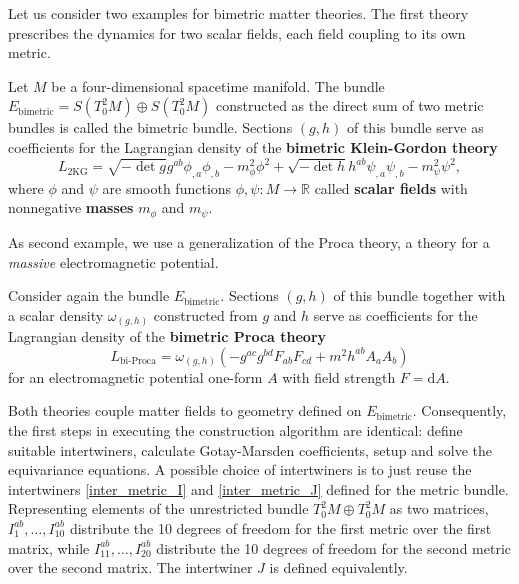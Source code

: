 Let us consider two examples for bimetric matter theories. The first theory prescribes the dynamics for two scalar fields, each field coupling to its own metric.
\begin{definition}
  Let $M$ be a four-dimensional spacetime manifold. The bundle $E_\text{bimetric} = S(T^2_0M) \oplus S(T^2_0M)$ constructed as the direct sum of two metric bundles is called the bimetric bundle. Sections $(g,h)$ of this bundle serve as coefficients for the Lagrangian density of the \textbf{bimetric Klein-Gordon theory}
  \begin{equation}
    L_\text{2KG} = \sqrt{-\operatorname{det}g}g^{ab} \phi_{,a}\phi_{,b} - m_\phi^2 \phi^2 + \sqrt{-\operatorname{det}h}h^{ab} \psi_{,a}\psi_{,b} - m_\psi^2 \psi^2,
  \end{equation}
  where $\phi$ and $\psi$ are smooth functions $\phi,\psi\colon M\rightarrow \mathbb R$ called \textbf{scalar fields} with nonnegative \textbf{masses} $m_\phi$ and $m_\psi$.
\end{definition}
As second example, we use a generalization of the Proca theory, a theory for a \emph{massive} electromagnetic potential.
\begin{definition}
  Consider again the bundle $E_\text{bimetric}$. Sections $(g,h)$ of this bundle together with a scalar density $\omega_{(g,h)}$ constructed from $g$ and $h$ serve as coefficients for the Lagrangian density of the \textbf{bimetric Proca theory}
  \begin{equation}
    L_\text{bi-Proca} = \omega_{(g,h)}\left( -g^{ac} g^{bd} F_{ab} F_{cd} + m^2 h^{ab} A_a A_b \right)
  \end{equation}
  for an electromagnetic potential one-form $A$ with field strength $F=\mathrm dA$.
\end{definition}

Both theories couple matter fields to geometry defined on $E_\text{bimetric}$. Consequently, the first steps in executing the construction algorithm are identical: define suitable intertwiners, calculate Gotay-Marsden coefficients, setup and solve the equivariance equations. A possible choice of intertwiners is to just reuse the intertwiners \eqref{inter_metric_I} and \eqref{inter_metric_J} defined for the metric bundle. Representing elements of the unrestricted bundle $T^2_0M\oplus T^2_0M$ as two matrices, $I_1^{ab},\dots,I_{10}^{ab}$ distribute the 10 degrees of freedom for the first metric over the first matrix, while $I_{11}^{ab},\dots,I_{20}^{ab}$ distribute the 10 degrees of freedom for the second metric over the second matrix. The intertwiner $J$ is defined equivalently.

